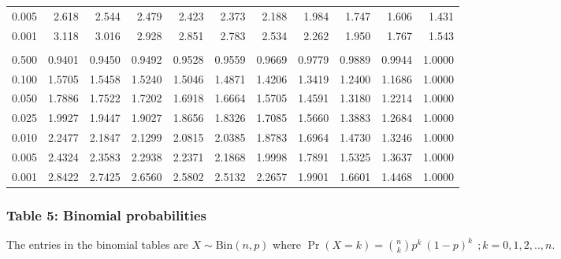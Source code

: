 \documentclass[
]{article}
\begin{document}
\begin{longtable}[t]{lrrrrrrrrrr}
\hspace{1em}0.005 & 2.618 & 2.544 & 2.479 & 2.423 & 2.373 & 2.188 & 1.984 & 1.747 & 1.606 & 1.431\\
\hspace{1em}0.001 & 3.118 & 3.016 & 2.928 & 2.851 & 2.783 & 2.534 & 2.262 & 1.950 & 1.767 & 1.543\\
\addlinespace[0.3em]
\multicolumn{11}{l}{$k_2=\infty$}\\
\hspace{1em}0.500 & 0.9401 & 0.9450 & 0.9492 & 0.9528 & 0.9559 & 0.9669 & 0.9779 & 0.9889 & 0.9944 & 1.0000\\
\hspace{1em}0.100 & 1.5705 & 1.5458 & 1.5240 & 1.5046 & 1.4871 & 1.4206 & 1.3419 & 1.2400 & 1.1686 & 1.0000\\
\hspace{1em}0.050 & 1.7886 & 1.7522 & 1.7202 & 1.6918 & 1.6664 & 1.5705 & 1.4591 & 1.3180 & 1.2214 & 1.0000\\
\hspace{1em}0.025 & 1.9927 & 1.9447 & 1.9027 & 1.8656 & 1.8326 & 1.7085 & 1.5660 & 1.3883 & 1.2684 & 1.0000\\
\hspace{1em}0.010 & 2.2477 & 2.1847 & 2.1299 & 2.0815 & 2.0385 & 1.8783 & 1.6964 & 1.4730 & 1.3246 & 1.0000\\
\hspace{1em}0.005 & 2.4324 & 2.3583 & 2.2938 & 2.2371 & 2.1868 & 1.9998 & 1.7891 & 1.5325 & 1.3637 & 1.0000\\
\hspace{1em}0.001 & 2.8422 & 2.7425 & 2.6560 & 2.5802 & 2.5132 & 2.2657 & 1.9901 & 1.6601 & 1.4468 & 1.0000\\
\bottomrule
\end{longtable}

\newpage

\subsubsection{Table 5: Binomial
probabilities}\label{table-5-binomial-probabilities}

The entries in the binomial tables are \(X\sim\text{Bin}(n,p)\) where
\(\Pr(X=k)= \binom{n}{k}p^k\ (1-p)^k\ \ ; k=0, 1, 2, .., n\).
\end{document}
